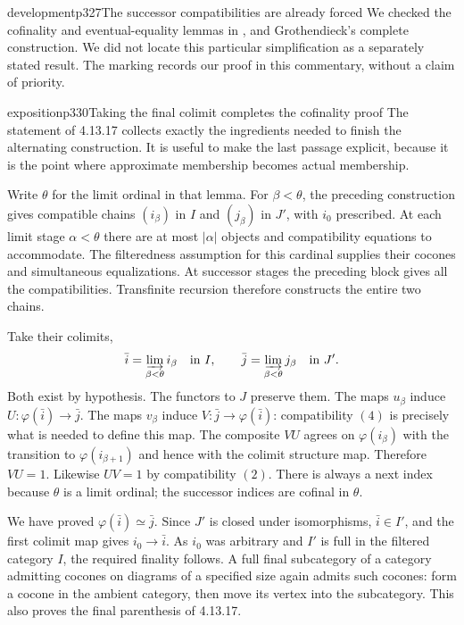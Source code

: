 \begin{dcomment}{development}{p327}{The successor compatibilities are already forced}
We checked the cofinality and eventual-equality lemmas in \citet{StacksCofinal,StacksFiltered}, and Grothendieck's complete construction. We did not locate this particular simplification as a separately stated result. The marking records our proof in this commentary, without a claim of priority.
\end{dcomment}

\begin{dcomment}{exposition}{p330}{Taking the final colimit completes the cofinality proof}
The statement of 4.13.17 collects exactly the ingredients needed to finish the alternating construction. It is useful to make the last passage explicit, because it is the point where approximate membership becomes actual membership.

Write $\theta$ for the limit ordinal in that lemma. For $\beta<\theta$, the preceding construction gives compatible chains $(i_\beta)$ in $I$ and $(j_\beta)$ in $J'$, with $i_0$ prescribed. At each limit stage $\alpha<\theta$ there are at most $\lvert\alpha\rvert$ objects and compatibility equations to accommodate. The filteredness assumption for this cardinal supplies their cocones and simultaneous equalizations. At successor stages the preceding block gives all the compatibilities. Transfinite recursion therefore constructs the entire two chains.

Take their colimits,
\[
 \bar i=\varinjlim_{\beta<\theta}i_\beta\quad\hbox{in }I,
 \qquad
 \bar j=\varinjlim_{\beta<\theta}j_\beta\quad\hbox{in }J'.
\]
Both exist by hypothesis. The functors to $J$ preserve them. The maps $u_\beta$ induce $U:\varphi(\bar i)\to\bar j$. The maps $v_\beta$ induce $V:\bar j\to\varphi(\bar i)$: compatibility $(4)$ is precisely what is needed to define this map. The composite $VU$ agrees on $\varphi(i_\beta)$ with the transition to $\varphi(i_{\beta+1})$ and hence with the colimit structure map. Therefore $VU=1$. Likewise $UV=1$ by compatibility $(2)$. There is always a next index because $\theta$ is a limit ordinal; the successor indices are cofinal in $\theta$.

We have proved $\varphi(\bar i)\simeq\bar j$. Since $J'$ is closed under isomorphisms, $\bar i\in I'$, and the first colimit map gives $i_0\to\bar i$. As $i_0$ was arbitrary and $I'$ is full in the filtered category $I$, the required finality follows. A full final subcategory of a category admitting cocones on diagrams of a specified size again admits such cocones: form a cocone in the ambient category, then move its vertex into the subcategory. This also proves the final parenthesis of 4.13.17.


\end{dcomment}

